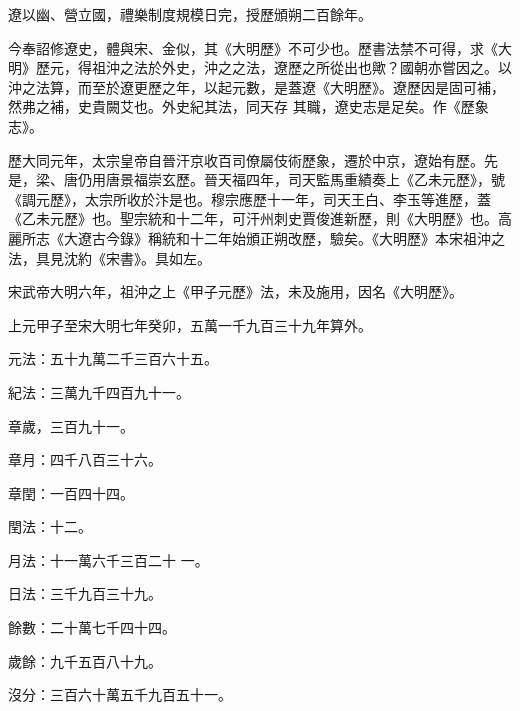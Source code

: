 
\begin{pinyinscope}

 遼以幽、營立國，禮樂制度規模日完，授歷頒朔二百餘年。



 今奉詔修遼史，體與宋、金似，其《大明歷》不可少也。歷書法禁不可得，求《大明》歷元，得祖沖之法於外史，沖之之法，遼歷之所從出也歟？國朝亦嘗因之。以沖之法算，而至於遼更歷之年，以起元數，是蓋遼《大明歷》。遼歷因是固可補，然弗之補，史貴闕艾也。外史紀其法，同天存
 其職，遼史志是足矣。作《歷象志》。



 歷大同元年，太宗皇帝自晉汗京收百司僚屬伎術歷象，遷於中京，遼始有歷。先是，梁、唐仍用唐景福崇玄歷。晉天福四年，司天監馬重績奏上《乙未元歷》，號《調元歷》，太宗所收於汴是也。穆宗應歷十一年，司天王白、李玉等進歷，蓋《乙未元歷》也。聖宗統和十二年，可汗州刺史賈俊進新歷，則《大明歷》也。高麗所志《大遼古今錄》稱統和十二年始頒正朔改歷，驗矣。《大明歷》本宋祖沖之法，具見沈約《宋書》。具如左。



 宋武帝大明六年，祖沖之上《甲子元歷》法，未及施用，因名《大明歷》。



 上元甲子至宋大明七年癸卯，五萬一千九百三十九年算外。



 元法：五十九萬二千三百六十五。



 紀法：三萬九千四百九十一。



 章歲，三百九十一。



 章月：四千八百三十六。



 章閏：一百四十四。



 閏法：十二。



 月法：十一萬六千三百二十
 一。



 日法：三千九百三十九。



 餘數：二十萬七千四十四。



 歲餘：九千五百八十九。



 沒分：三百六十萬五千九百五十一。




\end{pinyinscope}
